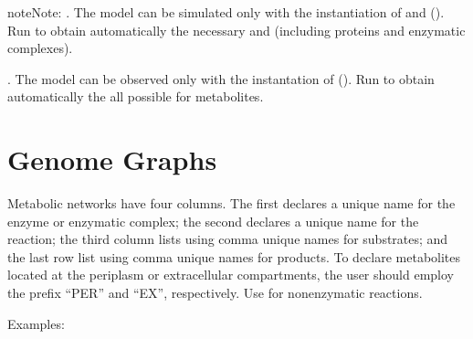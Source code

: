 \documentclass[letterpaper,10pt,english]{sphinxmanual}
\begin{document}
\begin{sphinxadmonition}{note}{Note:}
. The model can be simulated only with the instantiation of
 and  ().
Run  to obtain
automatically the necessary  and  (including
proteins and enzymatic complexes).

. The model can be observed only with the instantation of
 ().
Run  to obtain
automatically the all possible  for metabolites.
\end{sphinxadmonition}


\section{Genome Graphs}
\label{\detokenize{NetGenomeGraphs:genome-graphs}}\label{\detokenize{NetGenomeGraphs:net-genomegraphs}}\label{\detokenize{NetGenomeGraphs::doc}}
Metabolic networks have four columns. The first declares a unique name for the
enzyme or enzymatic complex; the second declares a unique name for the reaction;
the third column lists using comma unique names for substrates; and the last row
list using comma unique names for products. To declare metabolites located at
the periplasm or extracellular compartments, the user should employ the prefix
“PER\sphinxhyphen{}” and “EX\sphinxhyphen{}”, respectively. Use  for non\sphinxhyphen{}enzymatic reactions.

Examples:
\end{document}
